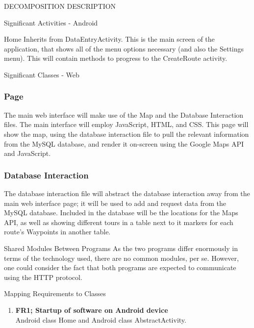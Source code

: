 \documentclass{article}
\begin{document}
\begin{section}{DECOMPOSITION DESCRIPTION}
\begin{subsection}{Significant Activities - Android}
		    \begin{subsubsection}{Home}
		    Inherits from DataEntryActivity. This is the main screen of the application, that shows all of the menu options necessary (and also the Settings menu). This will contain methods to progress to the CreateRoute activity.
		    \end{subsubsection}
	    \end{subsection}
	
	    \begin{subsection}{Significant Classes - Web}
		    \subsubsection{Page}
		    The main web interface will make use of the Map and the Database Interaction files. The main interface will employ JavaScript, HTML, and CSS. This page will show the map, using the database interaction file to pull the relevant information from the MySQL database, and render it on-screen using the Google Maps API and JavaScript.
		    
		    \subsubsection{Database Interaction}
		    The database interaction file will abstract the database interaction away from the main web interface page; it will be used to add and request data from the MySQL database. Included in the database will be the locations for the Maps API, as well as showing different tours in a table next to it markers for each route's Waypoints in another table.
	    \end{subsection}
    
    \begin{subsection}{Shared Modules Between Programs}
        As the two programs differ enormously in terms of the technology used, there are no common modules, per se. However, one could consider the fact that both programs are expected to communicate using the HTTP protocol.
    \end{subsection}


	\clearpage
	\begin{subsection}{Mapping Requirements to Classes}
        \begin{enumerate}
		    \item{{\bf FR1; Startup of software on Android device} \\
		    Android class Home and Android class AbstractActivity.}


\end{enumerate}
\end{subsection}
\end{section}
\end{document}
